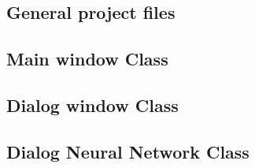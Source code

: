 \documentclass[11pt,fleqn,,a4paper,twoside,openright]{book}
\begin{document}
\subsection{General project files}


\newpage
\subsection{Main window Class}


\newpage
\subsection{Dialog window Class}


\newpage
\subsection{Dialog Neural Network Class}


\newpage
\end{document}
